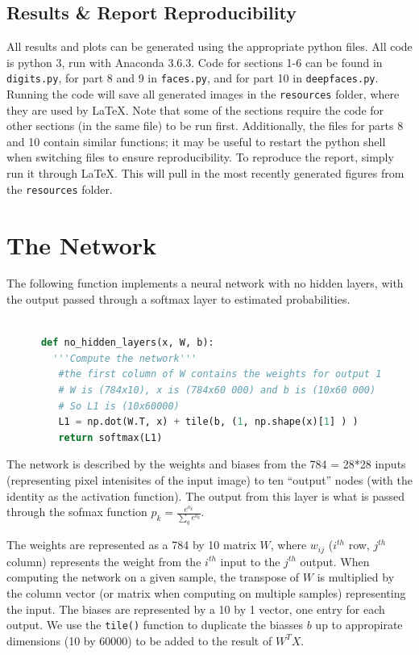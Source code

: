 \documentclass{article}
\begin{document}
   \subsection{Results \& Report Reproducibility}
   All results and plots can be generated using the appropriate python files.
   All code is python 3, run with Anaconda 3.6.3.
   Code for sections 1-6 can be found in \texttt{digits.py}, for part 8 and 9 in \texttt{faces.py},
   and for part 10 in \texttt{deepfaces.py}.
   Running the code will save all generated images in the \texttt{resources} folder,
   where they are used by \LaTeX. Note that some of the sections require the code for
   other sections (in the same file) to be run first. Additionally, the files for parts 8 and 10
   contain similar functions; it may be useful to restart the python shell when switching files
   to ensure reproducibility.
   To reproduce the report, simply run it through \LaTeX. This will pull in the most recently
   generated figures from the \texttt{resources} folder.


   \section{The Network}
   The following function implements a neural network with no hidden layers, with the
   output passed through a softmax layer to estimated probabilities.

   \begin{lstlisting}[language=Python]

      def no_hidden_layers(x, W, b):
   	    '''Compute the network'''
      	 #the first column of W contains the weights for output 1
       	 # W is (784x10), x is (784x60 000) and b is (10x60 000)
       	 # So L1 is (10x60000)
      	 L1 = np.dot(W.T, x) + tile(b, (1, np.shape(x)[1] ) )
     	 return softmax(L1)
   \end{lstlisting}

   The network is described by the weights and biases from the 784 = 28*28 inputs
   (representing pixel intenisites of the input image) to ten ``output'' nodes
   (with the identity as the activation function). The output from this layer is what is
   passed through the sofmax function $p_k = \frac{ e^{o_k} }{ \sum_q e^{o_q}}$.

   The weights are represented as a 784 by 10 matrix $W$, where $w_{ij}$ ($i^{th}$ row, $j^{th}$
   column) represents the weight from the $i^{th}$ input to the $j^{th}$ output.
   When computing the network on a given sample, the transpose of $W$ is multiplied
   by the column vector (or matrix when computing on multiple samples) representing the input.
   The biases are represented by a 10 by 1 vector, one entry for each output. We use the \texttt{tile()} function
   to duplicate the biasses $b$ up to appropirate dimensions (10 by 60000) to be added to the result of $W^T X$.
\end{document}

